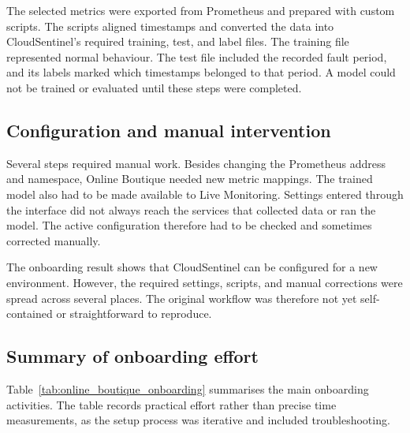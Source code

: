 The selected metrics were exported from Prometheus and prepared with custom scripts. The scripts aligned timestamps and converted the data into CloudSentinel's required training, test, and label files. The training file represented normal behaviour. The test file included the recorded fault period, and its labels marked which timestamps belonged to that period. A model could not be trained or evaluated until these steps were completed.

\subsection{Configuration and manual intervention}
Several steps required manual work. Besides changing the Prometheus address and namespace, Online Boutique needed new metric mappings. The trained model also had to be made available to Live Monitoring. Settings entered through the interface did not always reach the services that collected data or ran the model. The active configuration therefore had to be checked and sometimes corrected manually.

The onboarding result shows that CloudSentinel can be configured for a new environment. However, the required settings, scripts, and manual corrections were spread across several places. The original workflow was therefore not yet self-contained or straightforward to reproduce.

\subsection{Summary of onboarding effort}
Table~\ref{tab:online_boutique_onboarding} summarises the main onboarding activities. The table records practical effort rather than precise time measurements, as the setup process was iterative and included troubleshooting.

